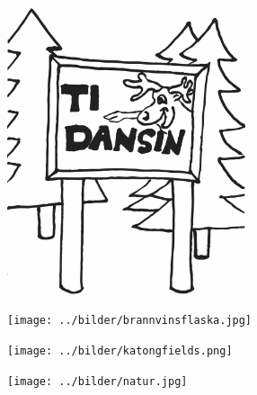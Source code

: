 %

\begin{intersong}
\sffamily\bfseries\LARGE{}
	\includegraphics[width=7cm]{../bilder/fardigabilder/BilderTillKapitel/tidansin.png} 
\end{intersong}
\clearpage

\clearpage

\clearpage

\clearpage

\begin{intersong}
\begin{center}
\texttt{[image: ../bilder/brannvinsflaska.jpg]} 
\end{center}
\end{intersong}
\clearpage

\clearpage

\begin{intersong}[!h]
\begin{center}
\texttt{[image: ../bilder/katongfields.png]} 
\end{center}
\end{intersong}

\begin{intersong}
\begin{center}
\texttt{[image: ../bilder/natur.jpg]} 
\end{center}
\end{intersong}
\clearpage

\clearpage

\clearpage

\clearpage

%